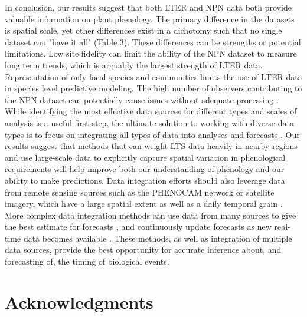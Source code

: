 \documentclass[fleqn,12pt,lineno]{wlpeerj} %
\begin{document}
In conclusion, our results suggest that both LTER and NPN data both provide valuable information on plant phenology. The primary difference in the datasets is spatial scale, yet other differences exist in a dichotomy such that no single dataset can "have it all" (Table 3). These differences can be strengths or potential limitations. Low site fidelity can limit the ability of the NPN dataset to measure long term trends, which is arguably the largest strength of LTER data. Representation of only local species and communities limits the use of LTER data in species level predictive modeling. The high number of observers contributing to the NPN dataset can potentially cause issues without adequate processing \citep{gerst2016}. While identifying the most effective data sources for different types and scales of analysis is a useful first step, the ultimate solution to working with diverse data types is to focus on integrating all types of data into analyses and forecasts \citep{hanks2018, melaas2016}. Our results suggest that methods that can weight LTS data heavily in nearby regions and use large-scale data to explicitly capture spatial variation in phenological requirements will help improve both our understanding of phenology and our ability to make predictions. Data integration efforts should also leverage data from remote sensing sources such as the PHENOCAM network or satellite imagery, which have a large spatial extent as well as a daily temporal grain \citep{richardson2018}. More complex data integration methods can use data from many sources to give the best estimate for forecasts \citep{ogle2015}, and continuously update forecasts as new real-time data becomes available \citep{luo2011, dietze2018}. These methods, as well as integration of multiple data sources, provide the best opportunity for accurate inference about, and forecasting of, the timing of biological events.


\section*{Acknowledgments}







\newpage
\end{document}
